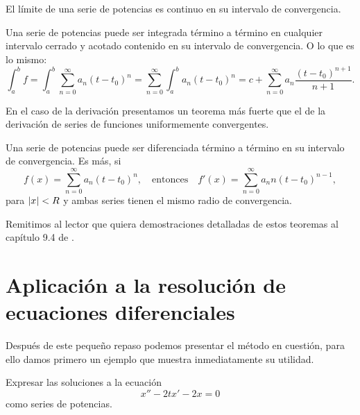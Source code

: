 \documentclass[../ecuaciones_diferenciales.tex]{subfiles}
\begin{document}
\begin{corollary}
	El límite de una serie de potencias es continuo en su intervalo de
	convergencia.
\end{corollary}

\begin{theorem}[Integración]
	Una serie de potencias puede ser integrada término a término en cualquier
	intervalo cerrado y acotado contenido en su intervalo de convergencia. O lo
	que es lo mismo:
	\[\int_a^b f = \int_a^b \sum_{n = 0}^\infty a_n (t - t_0)^n
		= \sum_{n = 0}^\infty \int_a^b a_n (t - t_0)^n
		= c + \sum_{n = 0}^\infty a_n \frac{(t - t_0)^{n + 1}}{n + 1}.\]
\end{theorem}

En el caso de la derivación presentamos un teorema más fuerte que el de la
derivación de series de funciones uniformemente convergentes.

\begin{theorem}[Diferenciación]
	Una serie de potencias puede ser diferenciada término a término en su
	intervalo de convergencia. Es más, si
	\[f(x) = \sum_{n = 0}^\infty a_n (t - t_0)^n, \quad \text{entonces} \quad
		f'(x) = \sum_{n = 0}^\infty a_n n (t - t_0)^{n - 1},\]
	para \(\abs{x} < R\) y ambas series tienen el mismo radio de convergencia.
\end{theorem}

Remitimos al lector que quiera demostraciones detalladas de estos
teoremas al capítulo 9.4 de \cite{introduction_real_analysis}.

\section{Aplicación a la resolución de ecuaciones diferenciales}

Después de este pequeño repaso podemos presentar el método en cuestión, para
ello damos primero un ejemplo que muestra inmediatamente su utilidad.
\begin{example}
	Expresar las soluciones a la ecuación
	\begin{equation} \label{eq:eqpot}
		x''-2tx'-2x=0
	\end{equation}
	como series de potencias.
\end{example}
\end{document}
